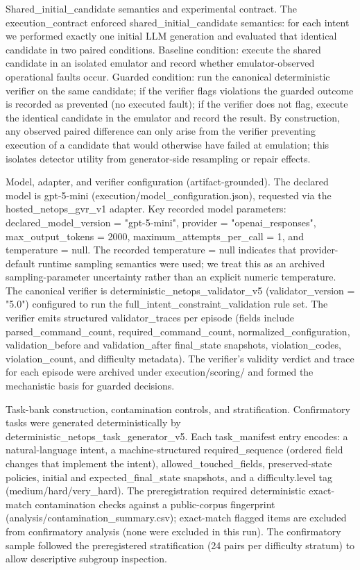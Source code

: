 \documentclass[conference]{IEEEtran}
\begin{document}
Shared\_initial\_candidate semantics and experimental contract. The execution\_contract enforced shared\_initial\_candidate semantics: for each intent we performed exactly one initial LLM generation and evaluated that identical candidate in two paired conditions. Baseline condition: execute the shared candidate in an isolated emulator and record whether emulator-observed operational faults occur. Guarded condition: run the canonical deterministic verifier on the same candidate; if the verifier flags violations the guarded outcome is recorded as prevented (no executed fault); if the verifier does not flag, execute the identical candidate in the emulator and record the result. By construction, any observed paired difference can only arise from the verifier preventing execution of a candidate that would otherwise have failed at emulation; this isolates detector utility from generator-side resampling or repair effects.

Model, adapter, and verifier configuration (artifact-grounded). The declared model is gpt-5-mini (execution/model\_configuration.json), requested via the hosted\_netops\_gvr\_v1 adapter. Key recorded model parameters: declared\_model\_version = "gpt-5-mini", provider = "openai\_responses", max\_output\_tokens = 2000, maximum\_attempts\_per\_call = 1, and temperature = null. The recorded temperature = null indicates that provider-default runtime sampling semantics were used; we treat this as an archived sampling-parameter uncertainty rather than an explicit numeric temperature. The canonical verifier is deterministic\_netops\_validator\_v5 (validator\_version = "5.0") configured to run the full\_intent\_constraint\_validation rule set. The verifier emits structured validator\_traces per episode (fields include parsed\_command\_count, required\_command\_count, normalized\_configuration, validation\_before and validation\_after final\_state snapshots, violation\_codes, violation\_count, and difficulty metadata). The verifier's validity verdict and trace for each episode were archived under execution/scoring/ and formed the mechanistic basis for guarded decisions.

Task-bank construction, contamination controls, and stratification. Confirmatory tasks were generated deterministically by deterministic\_netops\_task\_generator\_v5. Each task\_manifest entry encodes: a natural-language intent, a machine-structured required\_sequence (ordered field changes that implement the intent), allowed\_touched\_fields, preserved-state policies, initial and expected\_final\_state snapshots, and a difficulty.level tag (medium/hard/very\_hard). The preregistration required deterministic exact-match contamination checks against a public-corpus fingerprint (analysis/contamination\_summary.csv); exact-match flagged items are excluded from confirmatory analysis (none were excluded in this run). The confirmatory sample followed the preregistered stratification (24 pairs per difficulty stratum) to allow descriptive subgroup inspection.
\end{document}
